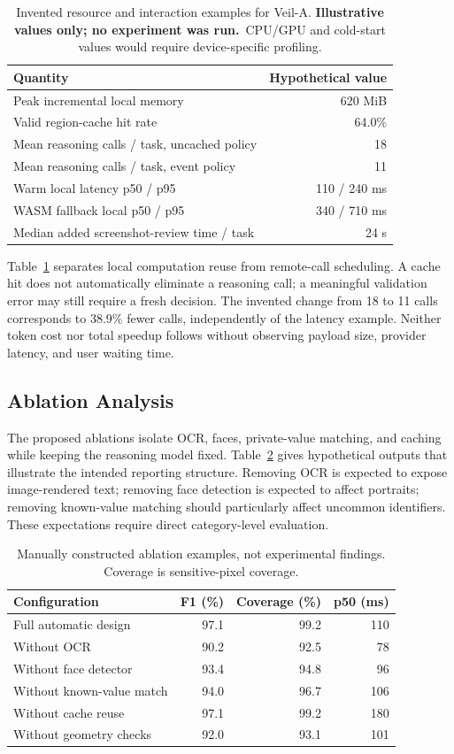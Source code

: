 \documentclass[conference]{IEEEtran}
\newcommand{\illustrative}{\textbf{Illustrative values only; no experiment was run.}}
\begin{document}
\begin{table}[t]
\centering\small
\caption{Invented resource and interaction examples for Veil-A. \illustrative\ CPU/GPU and cold-start values would require device-specific profiling.}
\label{tab:resource}
\begin{tabular}{lr}
\toprule
Quantity & Hypothetical value\\
\midrule
Peak incremental local memory & 620 MiB\\
Valid region-cache hit rate & 64.0\%\\
Mean reasoning calls / task, uncached policy & 18\\
Mean reasoning calls / task, event policy & 11\\
Warm local latency p50 / p95 & 110 / 240 ms\\
WASM fallback local p50 / p95 & 340 / 710 ms\\
Median added screenshot-review time / task & 24 s\\
\bottomrule
\end{tabular}
\end{table}

Table~\ref{tab:resource} separates local computation reuse from remote-call scheduling. A cache hit does not automatically eliminate a reasoning call; a meaningful validation error may still require a fresh decision. The invented change from 18 to 11 calls corresponds to 38.9\% fewer calls, independently of the latency example. Neither token cost nor total speedup follows without observing payload size, provider latency, and user waiting time.

\subsection{Ablation Analysis}
The proposed ablations isolate OCR, faces, private-value matching, and caching while keeping the reasoning model fixed. Table~\ref{tab:ablation} gives hypothetical outputs that illustrate the intended reporting structure. Removing OCR is expected to expose image-rendered text; removing face detection is expected to affect portraits; removing known-value matching should particularly affect uncommon identifiers. These expectations require direct category-level evaluation.

\begin{table}[t]
\centering\small
\caption{Manually constructed ablation examples, not experimental findings. Coverage is sensitive-pixel coverage.}
\label{tab:ablation}
\begin{tabular}{lrrr}
\toprule
Configuration & F1 (\%) & Coverage (\%) & p50 (ms)\\
\midrule
Full automatic design & 97.1 & 99.2 & 110\\
Without OCR & 90.2 & 92.5 & 78\\
Without face detector & 93.4 & 94.8 & 96\\
Without known-value match & 94.0 & 96.7 & 106\\
Without cache reuse & 97.1 & 99.2 & 180\\
Without geometry checks & 92.0 & 93.1 & 101\\
\bottomrule
\end{tabular}
\end{table}
\end{document}
